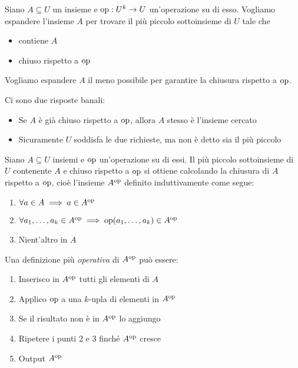 Siano $A \subseteq U$ un insieme e $\operatorname{op}: U^k \rightarrow U$ un'operazione su di esso. Vogliamo espandere l'insieme $A$ per trovare il più piccolo sottoinsieme di $U$ tale che
\begin{itemize}
	\item contiene $A$
    
	\item chiuso rispetto a $\operatorname{op}$
\end{itemize}

Vogliamo espandere $A$ il meno possibile per garantire la chiusura rispetto a $\operatorname{op}$.

Ci sono due risposte banali: 
\begin{itemize}
	\item Se $A$ è già chiuso rispetto a $\operatorname{op}$, allora $A$ stesso è l'insieme cercato
    
	\item Sicuramente $U$ soddisfa le due richieste, ma non è detto sia il più piccolo \\
\end{itemize}

\begin{theor}
	Siano $A \subseteq U$ insiemi e $\operatorname{op}$ un'operazione su di essi. Il più piccolo sottoinsieme di $U$ contenente $A$ e chiuso rispetto a $\operatorname{op}$ si ottiene calcolando la chiusura di $A$ rispetto a $\operatorname{op}$, cioè l'insieme $A^{\operatorname{op}}$ definito induttivamente come segue:
\begin{enumerate}
	\item $\forall a \in A \implies a \in A^{\operatorname{op}}$
    
	\item $\forall a_1, \dots, a_k \in A^{\operatorname{op}} \implies \operatorname{op}(a_1, \dots, a_k) \in A^{\operatorname{op}}$
    
	\item Nient'altro in $A$
\end{enumerate}
\end{theor}

Una definizione più \textit{operativa} di $A^{\operatorname{op}}$ può essere:
\begin{enumerate}
	\item Inserisco in $A^{\operatorname{op}}$ tutti gli elementi di $A$
	
    \item Applico $\operatorname{op}$ a una $k$-upla di elementi in $A^{\operatorname{op}}$
	
    \item Se il risultato non è in $A^{\operatorname{op}}$ lo aggiungo
  	
    \item Ripetere i punti 2 e 3 finché $A^{\operatorname{op}}$ cresce
	
    \item Output $A^{\operatorname{op}}$
\end{enumerate}

